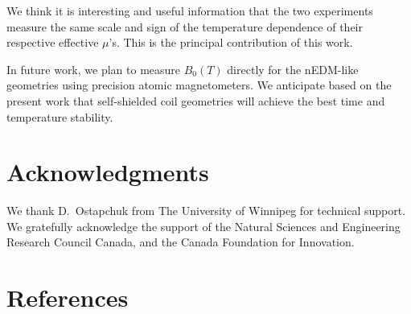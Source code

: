 \documentclass[review]{elsarticle}
\begin{document}
We think it is interesting and useful information that the two
experiments measure the same scale and sign of the temperature
dependence of their respective effective $\mu$'s.  This is the
principal contribution of this work.

In future work, we plan to measure $B_0(T)$ directly for the nEDM-like
geometries using precision atomic magnetometers.  We anticipate based
on the present work that self-shielded coil geometries will achieve
the best time and temperature stability.



\section{Acknowledgments}

We thank D.~Ostapchuk from The University of Winnipeg for technical
support.  We gratefully acknowledge the support of the Natural
Sciences and Engineering Research Council Canada, and the Canada
Foundation for Innovation.


\section*{References}
\end{document}
